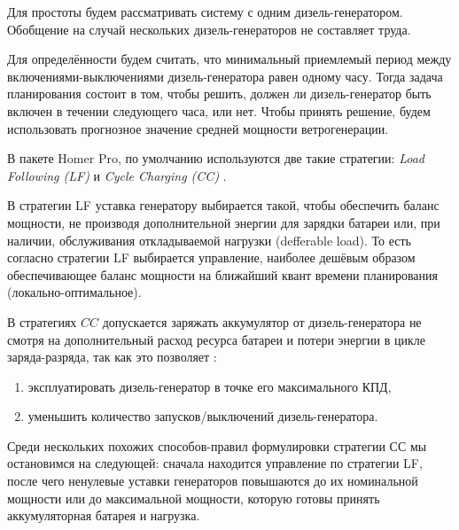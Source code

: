 Для простоты будем рассматривать систему с одним дизель-генератором. 
Обобщение на случай нескольких дизель-генераторов не составляет труда.

Для определённости будем считать, что минимальный приемлемый период между включениями-выключениями дизель-генератора равен одному часу.
Тогда задача планирования состоит в том, чтобы решить, должен ли дизель-генератор быть включен в течении следующего часа, или нет.
Чтобы принять решение, будем использовать прогнозное значение средней мощности ветрогенерации.
\cite{foley2012current}



В пакете Homer Pro, по умолчанию используются две такие стратегии: \textit{Load Following (LF)} \cite{lf} и \textit{Cycle Charging (CC)} \cite{cc}.

В стратегии LF уставка генератору выбирается такой, чтобы обеспечить баланс мощности, не производя дополнительной энергии для зарядки батареи или, при наличии, обслуживания откладываемой нагрузки (defferable load).
То есть согласно стратегии LF выбирается управление, наиболее дешёвым образом обеспечивающее баланс мощности на ближайший квант времени планирования (локально-оптимальное).

В стратегиях $CC$ допускается заряжать аккумулятор от дизель-генератора не смотря на дополнительный расход ресурса батареи и потери энергии в цикле заряда-разряда, так как это позволяет \cite{Barley1996}:
\begin{enumerate}
    \item  эксплуатировать дизель-генератор в точке его максимального КПД,
    \item уменьшить количество запусков/выключений дизель-генератора.
\end{enumerate}

Среди нескольких похожих способов-правил формулировки стратегии СС мы остановимся на следующей: сначала находится управление по стратегии LF, после чего ненулевые уставки генераторов повышаются до их номинальной мощности или до максимальной мощности, которую готовы принять аккумуляторная батарея и нагрузка.

